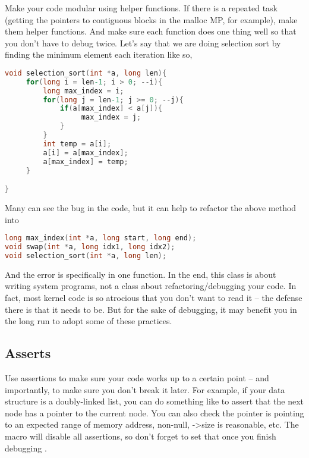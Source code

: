 Make your code modular using helper functions. If there is a repeated task (getting the pointers to contiguous blocks in the malloc MP, for example), make them helper functions.
And make sure each function does one thing well so that you don't have to debug twice.
Let's say that we are doing selection sort by finding the minimum element each iteration like so,

\begin{lstlisting}[language=C]
void selection_sort(int *a, long len){
     for(long i = len-1; i > 0; --i){
         long max_index = i;
         for(long j = len-1; j >= 0; --j){
             if(a[max_index] < a[j]){
                  max_index = j;
             }
         }
         int temp = a[i];
         a[i] = a[max_index];
         a[max_index] = temp;
     }

}
\end{lstlisting}

Many can see the bug in the code, but it can help to refactor the above method into

\begin{lstlisting}[language=C]
long max_index(int *a, long start, long end);
void swap(int *a, long idx1, long idx2);
void selection_sort(int *a, long len);
\end{lstlisting}

And the error is specifically in one function.
In the end, this class is about writing system programs, not a class about refactoring/debugging your code.
In fact, most kernel code is so atrocious that you don't want to read it -- the defense there is that it needs to be.
But for the sake of debugging, it may benefit you in the long run to adopt some of these practices.

\subsection{Asserts}

Use assertions to make sure your code works up to a certain point -- and importantly, to make sure you don't break it later.
For example, if your data structure is a doubly-linked list, you can do something like  to assert that the next node has a pointer to the current node.
You can also check the pointer is pointing to an expected range of memory address, non-null, -\textgreater{}size is reasonable, etc.
The  macro will disable all assertions, so don't forget to set that once you finish debugging \cite{cplusplus_assert}.

